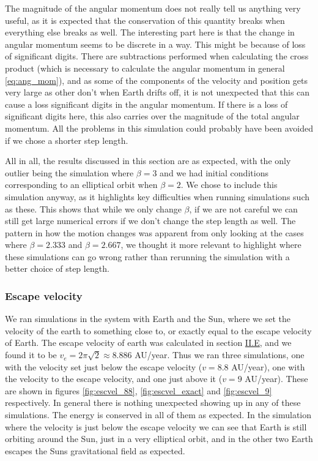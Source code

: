 \documentclass[reprint,english,notitlepage]{revtex4-1}  %
\begin{document}
The magnitude of the angular momentum does not really tell us anything very useful, as it is expected that the conservation of this quantity breaks when everything else breaks as well. The interesting part here is that the change in angular momentum seems to be discrete in a way. This might be because of loss of significant digits. There are subtractions performed when calculating the cross product (which is necessary to calculate the angular momentum in general \eqref{eq:ang_mom}), and as some of the components of the velocity and position gets very large as other don't when Earth drifts off, it is not unexpected that this can cause a loss significant digits in the angular momentum. If there is a loss of significant digits here, this also carries over the magnitude of the total angular momentum. All the problems in this simulation could probably have been avoided if we chose a shorter step length.

All in all, the results discussed in this section are as expected, with the only outlier being the simulation where $\beta = 3$ and we had initial conditions corresponding to an elliptical orbit when $\beta = 2$. We chose to include this simulation anyway, as it highlights key difficulties when running simulations such as these. This shows that while we only change $\beta$, if we are not careful we can still get large numerical errors if we don't change the step length as well. The pattern in how the motion changes was apparent from only looking at the cases where $\beta = 2.333$ and $\beta = 2.667$, we thought it more relevant to highlight where these simulations can go wrong rather than rerunning the simulation with a better choice of step length.



\subsubsection{Escape velocity} \label{sec:V:b:iii}

We ran simulations in the system with Earth and the Sun, where we set the velocity of the earth to something close to, or exactly equal to the escape velocity of Earth. The escape velocity of earth was calculated in section \hyperref[sec:II:e]{II.E}, and we found it to be $v_e = 2 \pi \sqrt{2} \approx 8.886$ AU/year.  Thus we ran three simulations, one with the velocity set just below the escape velocity ($v = 8.8$ AU/year), one with the velocity to the escape velocity, and one just above it ($v = 9$ AU/year). These are shown in figures \ref{fig:escvel_88}, \ref{fig:escvel_exact} and \ref{fig:escvel_9} respectively. In general there is nothing unexpected showing up in any of these simulations. The energy is conserved in all of them as expected. In the simulation where the velocity is just below the escape velocity we can see that Earth is still orbiting around the Sun, just in a very elliptical orbit, and in the other two Earth escapes the Suns gravitational field as expected.
\end{document}
